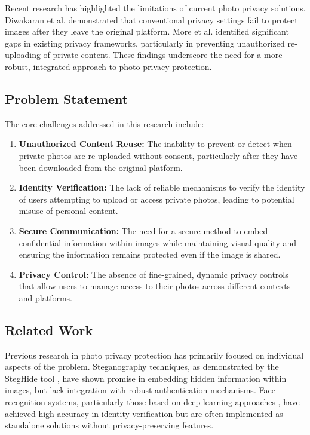 \documentclass[pdflatex,sn-mathphys-num]{sn-jnl}%
\theoremstyle{thmstyleone}%
\theoremstyle{thmstyletwo}%
\theoremstyle{thmstylethree}%
\begin{document}
Recent research has highlighted the limitations of current photo privacy solutions. Diwakaran et al. \cite{diwakaran2019privacy} demonstrated that conventional privacy settings fail to protect images after they leave the original platform. More et al. \cite{more2020privacy} identified significant gaps in existing privacy frameworks, particularly in preventing unauthorized re-uploading of private content. These findings underscore the need for a more robust, integrated approach to photo privacy protection.

\subsection{Problem Statement}
The core challenges addressed in this research include:

\begin{enumerate}
    \item \textbf{Unauthorized Content Reuse:} The inability to prevent or detect when private photos are re-uploaded without consent, particularly after they have been downloaded from the original platform.
    
    \item \textbf{Identity Verification:} The lack of reliable mechanisms to verify the identity of users attempting to upload or access private photos, leading to potential misuse of personal content.
    
    \item \textbf{Secure Communication:} The need for a secure method to embed confidential information within images while maintaining visual quality and ensuring the information remains protected even if the image is shared.
    
    \item \textbf{Privacy Control:} The absence of fine-grained, dynamic privacy controls that allow users to manage access to their photos across different contexts and platforms.
\end{enumerate}

\subsection{Related Work}
Previous research in photo privacy protection has primarily focused on individual aspects of the problem. Steganography techniques, as demonstrated by the StegHide tool \cite{stegHide}, have shown promise in embedding hidden information within images, but lack integration with robust authentication mechanisms. Face recognition systems, particularly those based on deep learning approaches \cite{deepFace}, have achieved high accuracy in identity verification but are often implemented as standalone solutions without privacy-preserving features.
\end{document}

